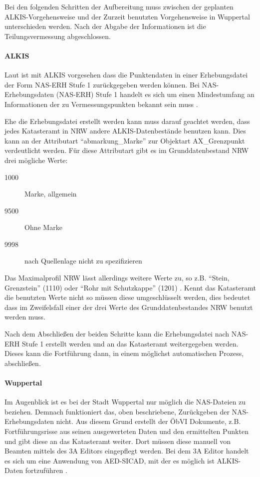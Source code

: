 Bei den folgenden Schritten der Aufbereitung muss zwischen der geplanten ALKIS-Vorgehensweise und der Zurzeit benutzten Vorgehensweise in Wuppertal unterschieden werden.
Nach der Abgabe der Informationen ist die Teilungsvermessung abgeschlossen. 

\paragraph{ALKIS}

Laut \autocite{jungemann-alltag} ist mit ALKIS vorgesehen dass die Punktendaten in einer Erhebungsdatei der Form NAS-ERH Stufe 1 zurückgegeben werden können.
Bei NAS-Erhebungsdaten (NAS-ERH) Stufe 1 handelt es sich um einen Mindestumfang an Informationen der zu Vermessungspunkten bekannt sein muss \autocite[vgl.][]{bezk-nas-erh}.

Ehe die Erhebungsdatei erstellt werden kann muss darauf geachtet werden, dass jedes Katasteramt in \ac{NRW} andere ALKIS-Datenbestände benutzen kann. Dies kann an der Attributart "`abmarkung\_Marke"' zur Objektart AX\_Grenzpunkt verdeutlicht werden. Für diese Attributart gibt es im  Grunddatenbestand NRW drei mögliche Werte:
\begin{description}
\item[1000] Marke, allgemein
\item[9500] Ohne Marke
\item[9998] nach Quellenlage nicht zu spezifizieren 
\end{description}
Das Maximalprofil NRW lässt allerdings weitere Werte zu, so z.B. "`Stein, Grenzstein"' (1110) oder "`Rohr mit Schutzkappe"' (1201) \autocite[vgl.][]{bezk-schluessel}. Kennt das Katasteramt die benutzten Werte nicht so müssen diese umgeschlüsselt werden, dies bedeutet dass im Zweifelsfall einer der drei Werte des Grunddatenbestandes NRW benutzt werden muss. 

Nach dem Abschließen der beiden Schritte kann die Erhebungsdatei nach NAS-ERH Stufe 1  erstellt werden und an das Katasteramt weitergegeben werden. Dieses kann die Fortführung dann, in einem möglichst automatischen Prozess, abschließen.

\paragraph{Wuppertal}
Im Augenblick ist es bei der Stadt Wuppertal nur möglich die NAS-Dateien zu beziehen. Demnach funktioniert das, oben beschriebene, Zurückgeben der NAS-Erhebungsdaten nicht. Aus diesem Grund erstellt der \ac{ÖbVI} Dokumente, z.B. Fortführungsrisse  aus seinen ausgewerteten Daten und den ermittelten Punkten und gibt diese an das Katasteramt weiter. Dort müssen diese manuell von Beamten mittels des 3A Editors eingepflegt werden. Bei dem 3A Editor handelt es sich um eine Anwendung von AED-SICAD, mit der es möglich ist ALKIS-Daten fortzuführen \autocite[vgl.][]{sicad-3a}.

